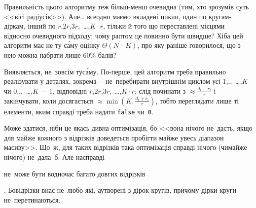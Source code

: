 Правильність цього алгоритму теж більш-менш очевидна (тим, хто зрозумів суть <<вісі радіусів>>). Але\dots{} все\nolinebreak[3] одно маємо вкладені цикли, один по кругам-діркам, інший по $r$,\nolinebreak[2] $2r$,\nolinebreak[2] $3r$,~\dots{},\nolinebreak[3] $K\cdot r$, тільки й того що переставлені місцями відносно очевидного підходу; чому раптом це повинно бути швидше? Хіба цей алгоритм має не ту с\'{а}му оцінку $\Theta({N\,{\cdot}\,K})$, про яку раніше говорилося, що з нею можна набрати лише 60\% балів?

Виявляється, не~зовсім ту\nolinebreak[3] с\'{а}му. По-перше, цей алгоритм треба правильно реалізувати у деталях, зокрема\nolinebreak[3] --- не~перебирати внутрішнім циклом \emph{усі} 
1,,,~\dots{},\nolinebreak[3] $K$ чи
0,,,~\dots{},\nolinebreak[3] ${K\,{-}\,1}$, відповідні 
$r$,\nolinebreak[2] $2r$,\nolinebreak[2] $3r$,~\dots{},\nolinebreak[3] $K\cdot r$; слід починати з $\approx\frac{d_i-r_i}{r}$ і закінчувати, коли досягається $\approx\min(K,\frac{d_i+r_i}{r})$, тобто переглядати лише ті елементи, яким справді треба надати \texttt{false} чи~\texttt{0}.
 
Може здатися, ніби це якась дивна оптимізація, бо <<вона нічого не~дасть, якщо для майже кожного з відрізків доведеться пробігти майже увесь діапазон масиву>>. Що~ж, для таких відрізків така оптимізація справді нічого (чи\nolinebreak[3] майже нічого) не~дала~б. Але насправді \begin{bfseries}\begin{itshape}не~може бути водночас багато довгих відрізків\end{itshape}\end{bfseries}. Бо\nolinebreak[3] відрізки в\nolinebreak[2] нас не~любо-які, а\nolinebreak[2] утворені з дірок-кругів, причому дірки-круги не~перетинаються.


